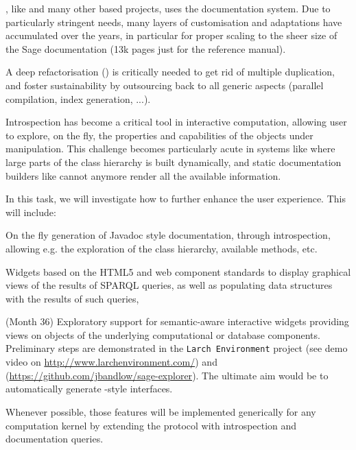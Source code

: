 \begin{workpackage}
\begin{tasklist}
\begin{task}[id=sage-sphinx, title=Refactor \Sage's \Sphinx documentation system, lead=PS,PM=6, partners={SR,UV,UG}, wphases=0-36, issue=72]
  \Sage, like \Python and many other \Python based projects, uses the
  \Sphinx documentation system. Due to particularly stringent needs,
  many layers of customisation and adaptations have accumulated over
  the years, in particular for proper scaling to the sheer size of the
  Sage documentation (13k pages just for the reference manual).

  A deep refactorisation () is critically
  needed to get rid of multiple duplication, and foster sustainability
  by outsourcing back to \Sphinx all generic aspects (parallel
  compilation, index generation, ...).
\end{task}

\begin{task}[id=dynamic-inspect,title=Dynamic documentation and exploration system,lead=PS, partners={SR,USO,UV,LL,UG}, PM=6, wphases=0-12, issue=73]
  Introspection has become a critical tool in interactive computation,
  allowing user to explore, on the fly, the properties and
  capabilities of the objects under manipulation. This challenge
  becomes particularly acute in systems like \Sage where large parts
  of the class hierarchy is built dynamically, and static
  documentation builders like \Sphinx cannot anymore render all the
  available information.

  In this task, we will investigate how to further enhance the user
  experience. This will include:
  \begin{compactitem}
  \item On the fly generation of Javadoc style documentation, through
    introspection, allowing e.g. the exploration of the class
    hierarchy, available methods, etc.
  \item Widgets based on the HTML5 and web component standards to display
    graphical views of the results of SPARQL queries, as well as populating data
    structures with the results of such queries,
  \item {} (Month 36)
    Exploratory support for semantic-aware interactive widgets
    providing views on objects of the underlying computational or
    database components. Preliminary steps are demonstrated in the
    \texttt{Larch Environment} project (see demo video on
    \url{http://www.larchenvironment.com/}) and
    (\url{https://github.com/jbandlow/sage-explorer}). The ultimate
    aim would be to automatically generate \LMFDB-style interfaces.
  \end{compactitem}
  Whenever possible, those features will be implemented generically
  for any computation kernel by extending the \Jupyter protocol with
  introspection and documentation queries.
\end{task}


\end{tasklist}
\end{workpackage}

